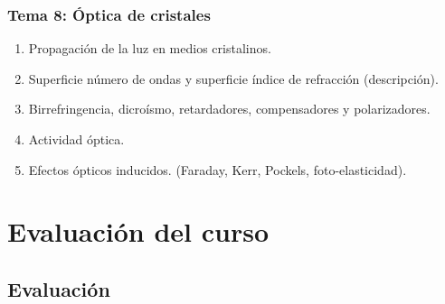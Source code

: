 \documentclass[12pt]{beamer}
\begin{document}
\begin{frame}
\frametitle{\textbf{Tema 8: Óptica de cristales}}
\begin{enumerate}[<+->]
\item Propagación de la luz en medios cristalinos.
\item Superficie número de ondas y superficie índice de refracción (descripción).
\item Birrefringencia, dicroísmo, retardadores, compensadores y polarizadores.
\item Actividad óptica.
\item Efectos ópticos inducidos. (Faraday, Kerr, Pockels, foto-elasticidad).
\end{enumerate}
\end{frame}

\section{Evaluación del curso}
\subsection{Evaluación}
\end{document}
